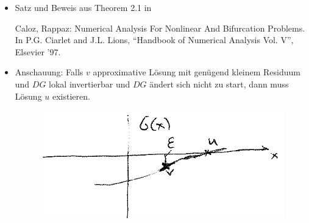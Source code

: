 \begin{bem} \beginwithlistbem
	\begin{itemize}
		\item Satz und Beweis aus Theorem 2.1 in

			Caloz, Rappaz: Numerical Analysis For Nonlinear And Bifurcation Problems. In P.G. Ciarlet and J.L. Lions, ``Handbook of Numerical Analysis Vol. V'', Elsevier '97.
		\item Anschauung: Falls $v$ approximative Lösung mit genügend kleinem Residuum und $DG$ lokal invertierbar und $DG$ ändert sich nicht zu start, dann muss Lösung $u$ existieren.
			\begin{figure}[H]
				\centering\small
				\includegraphics[width = 0.5 \textwidth]{Bilder/existenz-lokale-inverse.png}
			\end{figure}
	\end{itemize}
\end{bem}

